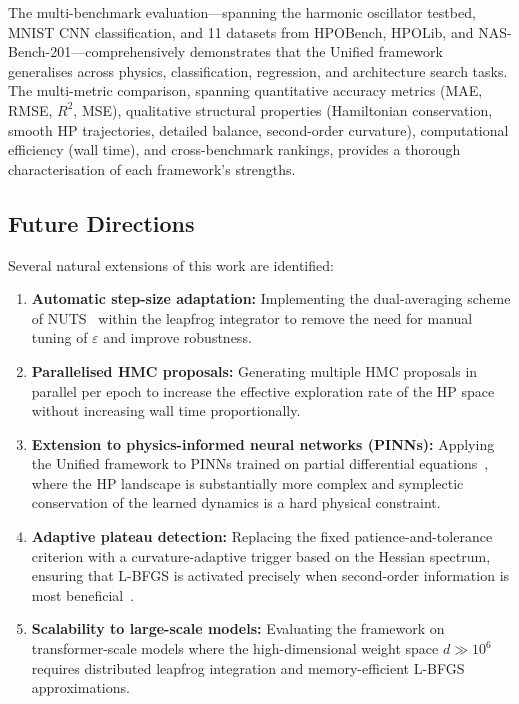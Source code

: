 \documentclass[11pt]{article}
\begin{document}
The multi-benchmark evaluation---spanning the harmonic oscillator
testbed, MNIST CNN classification, and 11 datasets from HPOBench,
HPOLib, and NAS-Bench-201---comprehensively demonstrates that the
Unified framework generalises across physics, classification, regression,
and architecture search tasks.  The multi-metric comparison, spanning
quantitative accuracy metrics (MAE, RMSE, $R^2$, MSE), qualitative
structural properties (Hamiltonian conservation, smooth HP trajectories,
detailed balance, second-order curvature), computational efficiency
(wall time), and cross-benchmark rankings, provides a thorough
characterisation of each framework's strengths.

\subsection*{Future Directions}

Several natural extensions of this work are identified:

\begin{enumerate}[leftmargin=*, label=\arabic*.]
\item \textbf{Automatic step-size adaptation:}  Implementing the
      dual-averaging scheme of NUTS~\cite{betancourt2017} within
      the leapfrog integrator to remove the need for manual tuning
      of $\varepsilon$ and improve robustness.

\item \textbf{Parallelised HMC proposals:}  Generating multiple
      HMC proposals in parallel per epoch to increase the effective
      exploration rate of the HP space without increasing wall time
      proportionally.

\item \textbf{Extension to physics-informed neural networks
      (PINNs):}  Applying the Unified framework to PINNs trained on
      partial differential equations~\cite{krishnapriyan2021,wang2023,kiyani2025},
      where the HP landscape is substantially more complex and
      symplectic conservation of the learned dynamics is a hard
      physical constraint.

\item \textbf{Adaptive plateau detection:}  Replacing the fixed
      patience-and-tolerance criterion with a curvature-adaptive
      trigger based on the Hessian spectrum, ensuring that L-BFGS
      is activated precisely when second-order information is most
      beneficial~\cite{rathore2024}.

\item \textbf{Scalability to large-scale models:}  Evaluating the
      framework on transformer-scale models where the high-dimensional
      weight space $d \gg 10^6$ requires distributed leapfrog
      integration and memory-efficient L-BFGS approximations.
\end{enumerate}
\end{document}
